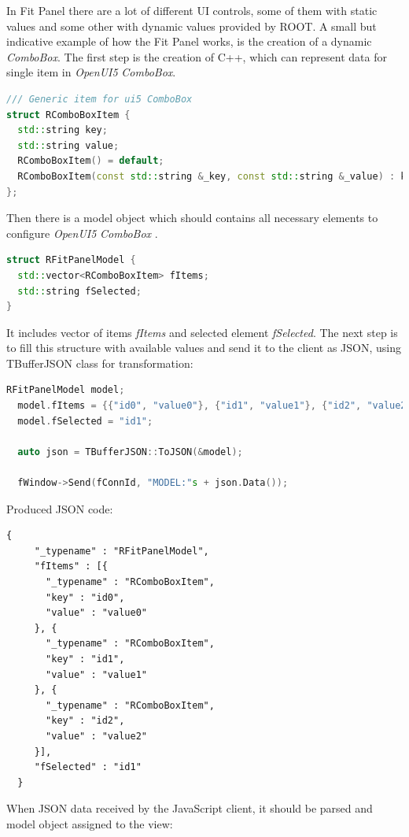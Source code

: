 \documentclass[a4paper]{jpconf}
\begin{document}
In Fit Panel there are a lot of different UI controls, some of them with static
values and some other with dynamic values provided by ROOT. A small but indicative
example of how the Fit Panel works, is the creation of a dynamic \textit{ComboBox}.
The first step is the creation of C++, which can represent data for single item
in \textit{OpenUI5} \textit{ComboBox}.
\\
\begin{lstlisting}[language=C++]
/// Generic item for ui5 ComboBox
struct RComboBoxItem {
  std::string key;
  std::string value;
  RComboBoxItem() = default;
  RComboBoxItem(const std::string &_key, const std::string &_value) : key(_key), value(_value) {}
};
\end{lstlisting}
\noindent
Then there is a model object which should contains all necessary elements to configure \textit{OpenUI5} \textit{ComboBox} .

\begin{lstlisting}[language=C++]
struct RFitPanelModel {
  std::vector<RComboBoxItem> fItems;
  std::string fSelected;
}
\end{lstlisting}
\noindent
It includes vector of items \textit{fItems} and selected element \textit{fSelected}.
The next step is to fill this structure with available values and send it to the
client as JSON, using TBufferJSON class for transformation:

\begin{lstlisting}[language=C++]
  RFitPanelModel model;
  model.fItems = {{"id0", "value0"}, {"id1", "value1"}, {"id2", "value2"}};
  model.fSelected = "id1";

  auto json = TBufferJSON::ToJSON(&model);

  fWindow->Send(fConnId, "MODEL:"s + json.Data());
\end{lstlisting}

\noindent Produced JSON code:

\begin{lstlisting}[language=XML]
  {
     "_typename" : "RFitPanelModel",
     "fItems" : [{
       "_typename" : "RComboBoxItem",
       "key" : "id0",
       "value" : "value0"
     }, {
       "_typename" : "RComboBoxItem",
       "key" : "id1",
       "value" : "value1"
     }, {
       "_typename" : "RComboBoxItem",
       "key" : "id2",
       "value" : "value2"
     }],
     "fSelected" : "id1"
  }
\end{lstlisting}
\noindent
When JSON data received by the JavaScript client, it should be parsed and model object assigned to the view:
\end{document}
